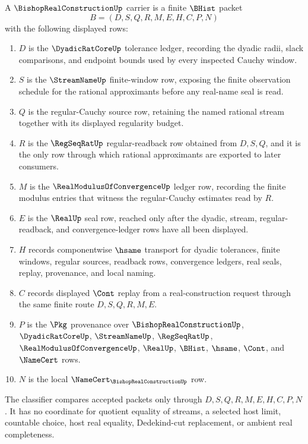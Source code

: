 \begin{definition}
\label{def:bishop-real-construction-carrier}
A $\BishopRealConstructionUp$ carrier is a finite $\BHist$ packet
$$
B=(D,S,Q,R,M,E,H,C,P,N)
$$
with the following displayed rows:
\begin{enumerate}
\item $D$ is the $\DyadicRatCoreUp$ tolerance ledger, recording the dyadic radii, slack comparisons, and endpoint bounds used by every inspected Cauchy window.
\item $S$ is the $\StreamNameUp$ finite-window row, exposing the finite observation schedule for the rational approximants before any real-name seal is read.
\item $Q$ is the regular-Cauchy source row, retaining the named rational stream together with its displayed regularity budget.
\item $R$ is the $\RegSeqRatUp$ regular-readback row obtained from $D,S,Q$, and it is the only row through which rational approximants are exported to later consumers.
\item $M$ is the $\RealModulusOfConvergenceUp$ ledger row, recording the finite modulus entries that witness the regular-Cauchy estimates read by $R$.
\item $E$ is the $\RealUp$ seal row, reached only after the dyadic, stream, regular-readback, and convergence-ledger rows have all been displayed.
\item $H$ records componentwise $\hsame$ transport for dyadic tolerances, finite windows, regular sources, readback rows, convergence ledgers, real seals, replay, provenance, and local naming.
\item $C$ records displayed $\Cont$ replay from a real-construction request through the same finite route $D,S,Q,R,M,E$.
\item $P$ is the $\Pkg$ provenance over $\BishopRealConstructionUp$, $\DyadicRatCoreUp$, $\StreamNameUp$, $\RegSeqRatUp$, $\RealModulusOfConvergenceUp$, $\RealUp$, $\BHist$, $\hsame$, $\Cont$, and $\NameCert$ rows.
\item $N$ is the local $\NameCert_{\BishopRealConstructionUp}$ row.
\end{enumerate}
The classifier compares accepted packets only through $D,S,Q,R,M,E,H,C,P,N$. It has no coordinate for quotient equality of streams, a selected host limit, countable choice, host real equality, Dedekind-cut replacement, or ambient real completeness.
\end{definition}

